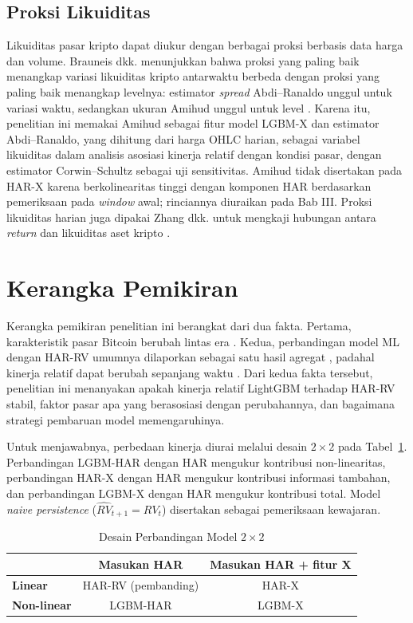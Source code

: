 \subsection{Proksi Likuiditas}
\label{subsec:likuiditas}
Likuiditas pasar kripto dapat diukur dengan berbagai proksi berbasis data harga
dan volume. Brauneis dkk. menunjukkan bahwa proksi yang paling baik menangkap
variasi likuiditas kripto antarwaktu berbeda dengan proksi yang paling baik
menangkap levelnya: estimator \textit{spread} Abdi--Ranaldo \cite{abdi2017} unggul untuk
variasi waktu, sedangkan ukuran Amihud unggul untuk level \cite{brauneis2021}.
Karena itu, penelitian ini memakai Amihud sebagai fitur model LGBM-X dan
estimator
Abdi--Ranaldo, yang dihitung dari harga OHLC harian, sebagai variabel likuiditas
dalam analisis asosiasi kinerja relatif dengan kondisi pasar, dengan estimator
Corwin--Schultz \cite{corwin2012} sebagai uji sensitivitas. Amihud tidak disertakan pada HAR-X
karena berkolinearitas tinggi dengan komponen HAR berdasarkan pemeriksaan pada
\textit{window} awal; rinciannya diuraikan pada Bab III. Proksi likuiditas harian juga
dipakai Zhang dkk. untuk mengkaji hubungan antara \textit{return} dan
likuiditas aset kripto \cite{zhang2024}.


\section{Kerangka Pemikiran}
Kerangka pemikiran penelitian ini berangkat dari dua fakta. Pertama,
karakteristik pasar Bitcoin berubah lintas era \cite{do2026,mokni2024}. Kedua,
perbandingan model ML dengan HAR-RV umumnya dilaporkan sebagai satu hasil
agregat \cite{dudek2024,huang2024}, padahal kinerja relatif dapat berubah
sepanjang waktu \cite{rossi2013,gama2014}. Dari kedua fakta tersebut,
penelitian ini menanyakan apakah kinerja relatif LightGBM terhadap HAR-RV
stabil, faktor pasar apa yang berasosiasi dengan perubahannya, dan bagaimana
strategi pembaruan model memengaruhinya.

Untuk menjawabnya, perbedaan kinerja diurai melalui desain $2 \times 2$ pada
Tabel~\ref{tab:desain}. Perbandingan LGBM-HAR dengan HAR mengukur kontribusi
non-linearitas, perbandingan HAR-X dengan HAR mengukur kontribusi informasi
tambahan, dan perbandingan LGBM-X dengan HAR mengukur kontribusi total. Model
\textit{naive persistence} ($\widehat{RV}_{t+1} = RV_t$) disertakan sebagai
pemeriksaan kewajaran.

\begin{table}[htbp]
  \caption{Desain Perbandingan Model $2 \times 2$}
  \label{tab:desain}
  \centering
  \begingroup
  \begin{tabular}{|l|c|c|}
    \hline
    & \textbf{Masukan HAR} & \textbf{Masukan HAR + fitur X} \\
    \hline
    \textbf{Linear} & HAR-RV (pembanding) & HAR-X \\
    \hline
    \textbf{Non-linear} & LGBM-HAR & LGBM-X \\
    \hline
  \end{tabular}
  \endgroup
\end{table}

